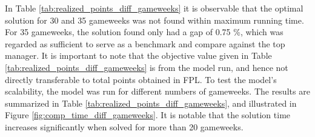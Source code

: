 \begin{table}[H]
\centering
{}
\caption{Model run with different number of gameweeks.}
\label{tab:realized_points_diff_gameweeks}
\end{table}

In Table \ref{tab:realized_points_diff_gameweeks} it is observable that the optimal solution for 30 and 35 gameweeks was not found within maximum running time. For 35 gameweeks, the solution found only had a gap of 0.75 \%, which was regarded as sufficient to serve as a benchmark and compare against the top manager. It is important to note that the objective value given in Table \ref{tab:realized_points_diff_gameweeks} is from the model run, and hence not directly transferable to total points obtained in FPL. To test the model's scalability, the model was run for different numbers of gameweeks. The results are summarized in Table \ref{tab:realized_points_diff_gameweeks}, and illustrated in Figure \ref{fig:comp_time_diff_gameweeks}. It is notable that the solution time increases significantly when solved for more than 20 gameweeks.

